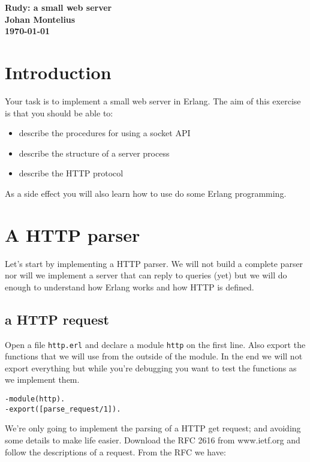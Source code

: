 \documentclass[a4paper, 11pt]{article}
\newcommand{\nnsection}[1]{
\section*{#1}
\addcontentsline{toc}{section}{#1}
}
\begin{document}
\begin{center}
\vspace{20pt}
\textbf{\large Rudy: a small web server}\\
\vspace{10pt}
\textbf{Johan Montelius}\\ 
\vspace{10pt}
\textbf{\today}
\end{center}

\nnsection{Introduction}

Your task is to implement a small web server in Erlang. The aim of
this exercise is that you should be able to:

\begin{itemize}
\item describe the procedures for using a socket API
\item describe the structure of a server process
\item describe the HTTP protocol 
\end{itemize}

As a side effect you will also learn how to use do some Erlang programming.

\section{A HTTP parser}

Let's start by implementing a HTTP parser. We will not build a
complete parser nor will we implement a server that can reply to 
queries (yet) but we will do enough to understand how Erlang works and
how HTTP is defined.

\subsection{a HTTP request}

Open a file {\tt http.erl} and declare a module {\tt http} on the
first line. Also export the functions that we will use from the
outside of the module. In the end we will not export everything but
while you're debugging you want to test the functions as we implement them.


\begin{verbatim}
-module(http).
-export([parse_request/1]).
\end{verbatim}

We're only going to implement the parsing of a HTTP get request; and
avoiding some details to make life easier. Download the RFC 2616 from
www.ietf.org and follow the descriptions of a request. From the RFC we have:
\end{document}
